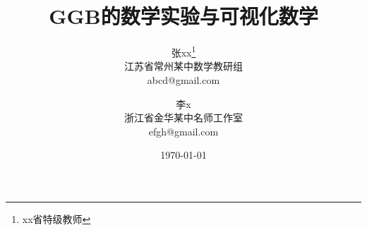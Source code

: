 \documentclass{ctexart}
\begin{document}
\title{\vspace{-8mm}\heiti{}GGB的数学实验与可视化数学\vspace{5mm}}
\author{张xx\thanks{xx省特级教师}\\[2mm]
江苏省常州某中数学教研组\\
abcd@gmail.com
\and
李\quad x\\[2mm]
浙江省金华某中名师工作室\\
efgh@gmail.com}
\date{\today}
\maketitle
\end{document}
